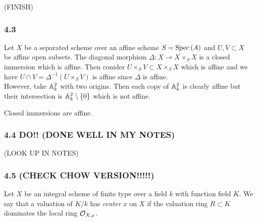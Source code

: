 \documentclass[12pt]{article}
\begin{document}
(FINISH)

\subsubsection{4.3}

Let $X$ be a separated scheme over an affine scheme $S = \mathrm{Spec}\left( A \right)$ and $U, V \subset X$ be affine open subsets. The diagonal morphism $\Delta : X \to X \times_S X$ is a closed immersion which is affine. Then conider $U \times_S V \subset X \times_S X$ which is affine and we have $U \cap V = \Delta^{-1}(U \times_S V)$ is affine since $\Delta$ is affine.
\bigskip\\
However, take $\mathbb{A}^2_k$ with two origins. Then each copy of $\mathbb{A}^2_k$ is clearly affine but their intersection is $\mathbb{A}^2_k \setminus \{ 0 \}$ which is not affine. 

\begin{lemma}
Closed immersions are affine.
\end{lemma}


\subsubsection{4.4 DO!! (DONE WELL IN MY NOTES)}

(LOOK UP IN NOTES)

\subsubsection{4.5 (CHECK CHOW VERSION!!!!!)}

Let $X$ be an integral scheme of finite type over a field $k$ with function field $K$. We say that a valuation of $K / k$ has \textit{center} $x$ on $X$ if the valuation ring $R \subset K$ dominates the local ring $\mathcal{O}_{X, x}$.
\end{document}
